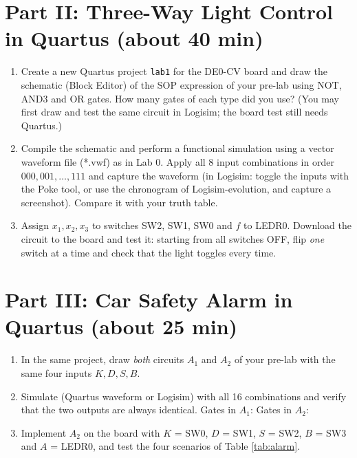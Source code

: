 \documentclass{article}
\begin{document}
\section*{Part II: Three-Way Light Control in Quartus (about 40 min)}

\begin{enumerate}
    \item Create a new Quartus project \texttt{lab1} for the DE0-CV board and draw the schematic (Block Editor) of the SOP expression of your pre-lab using NOT, AND3 and OR gates. How many gates of each type did you use? \underline{\hspace{4cm}} (You may first draw and test the same circuit in Logisim; the board test still needs Quartus.)
    \item Compile the schematic and perform a functional simulation using a vector waveform file (*.vwf) as in Lab 0. Apply all 8 input combinations in order $000, 001, \ldots, 111$ and capture the waveform (in Logisim: toggle the inputs with the Poke tool, or use the chronogram of Logisim-evolution, and capture a screenshot). Compare it with your truth table.
    \item Assign $x_1, x_2, x_3$ to switches SW2, SW1, SW0 and $f$ to LEDR0. Download the circuit to the board and test it: starting from all switches OFF, flip \emph{one} switch at a time and check that the light toggles every time.
\end{enumerate}

\section*{Part III: Car Safety Alarm in Quartus (about 25 min)}

\begin{enumerate}
    \item In the same project, draw \emph{both} circuits $A_1$ and $A_2$ of your pre-lab with the same four inputs $K, D, S, B$.
    \item Simulate (Quartus waveform or Logisim) with all 16 combinations and verify that the two outputs are always identical. Gates in $A_1$: \underline{\hspace{1.5cm}} \; Gates in $A_2$: \underline{\hspace{1.5cm}}
    \item Implement $A_2$ on the board with $K$ = SW0, $D$ = SW1, $S$ = SW2, $B$ = SW3 and $A$ = LEDR0, and test the four scenarios of Table \ref{tab:alarm}.
\end{enumerate}
\end{document}
